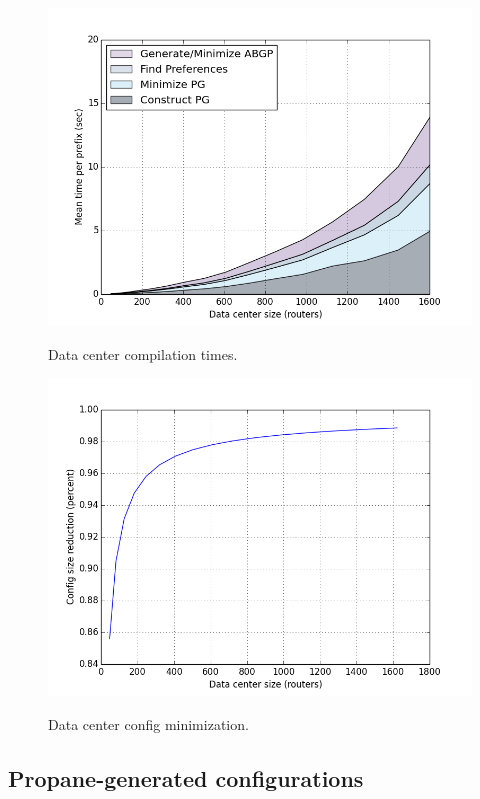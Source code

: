 \begin{figure}[t!]
\centering
\includegraphics[width=\columnwidth]{figures/compilation-times-dc.png}
\label{fig:compilation-times-dc}
\caption{Data center compilation times. }
\end{figure}

\begin{figure}[t!]
\centering
\includegraphics[width=\columnwidth]{figures/config-compression-dc.png}
\label{fig:compilation-compression-dc}
\caption{Data center config minimization.}
\end{figure} 

\subsection{Propane-generated configurations}

